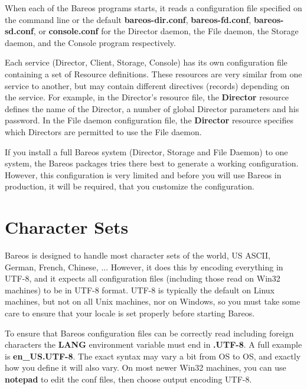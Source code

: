 

When each of the Bareos programs starts, it reads a configuration file
specified on the command line or the default {\bf bareos-dir.conf}, {\bf
bareos-fd.conf}, {\bf bareos-sd.conf}, or {\bf console.conf} for the Director
daemon, the File daemon, the Storage daemon, and the Console program
respectively.

Each service (Director, Client, Storage, Console) has its own configuration
file containing a set of Resource definitions. These resources are very
similar from one service to another, but may contain different directives
(records) depending on the service. For example, in the Director's resource
file, the {\bf Director} resource defines the name of the Director, a number
of global Director parameters and his password. In the File daemon
configuration file, the {\bf Director} resource specifies which Directors are
permitted to use the File daemon.

If you install a full Bareos system (Director, Storage and File Daemon) to one system,
the Bareos packages tries there best to generate a working configuration.
However, this configuration is very limited and before you will use Bareos in production,
it will be required, that you customize the configuration.



\section{Character Sets}
Bareos is designed to handle most character sets of the world,
US ASCII, German, French, Chinese, ...  However, it does this by
encoding everything in UTF-8, and it expects all configuration files
(including those read on Win32 machines) to be in UTF-8 format.
UTF-8 is typically the default on Linux machines, but not on all
Unix machines, nor on Windows, so you must take some care to ensure
that your locale is set properly before starting Bareos.

To ensure that Bareos configuration files can be correctly read including
foreign characters the {\bf LANG} environment variable
must end in {\bf .UTF-8}. A full example is {\bf en\_US.UTF-8}. The
exact syntax may vary a bit from OS to OS, and exactly how you define
it will also vary.  On most newer Win32 machines, you can use {\bf notepad}
to edit the conf files, then choose output encoding UTF-8.

